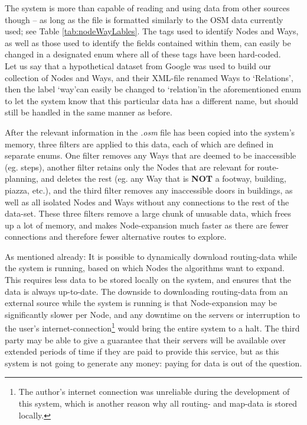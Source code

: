 The system is more than capable of reading and using data from other sources though -- as long as the file is formatted similarly to the OSM data currently used; see Table \ref{tab:nodeWayLables}. The tags used to identify Nodes and Ways, as well as those used to identify the fields contained within them, can easily be changed in a designated enum where all of these tags have been hard-coded.\\
Let us say that a hypothetical dataset from Google was used to build our collection of Nodes and Ways, and their XML-file renamed Ways to \textquoteleft Relations\textquoteright, then the label \textquoteleft way\textquoteright can easily be changed to \textquoteleft relation\textquoteright in the aforementioned enum to let the system know that this particular data has a different name, but should still be handled in the same manner as before.

After the relevant information in the \textit{.osm} file has been copied into the system's memory, three filters are applied to this data, each of which are defined in separate enums. One filter removes any Ways that are deemed to be inaccessible (eg. steps), another filter retains only the Nodes that are relevant for route-planning, and deletes the rest (eg. any Way that is \textbf{NOT} a footway, building, piazza, etc.), and the third filter removes any inaccessible doors in buildings, as well as all isolated Nodes and Ways without any connections to the rest of the data-set. These three filters remove a large chunk of unusable data, which frees up a lot of memory, and makes Node-expansion much faster as there are fewer connections and therefore fewer alternative routes to explore.

As mentioned already: It is possible to dynamically download routing-data while the system is running, based on which Nodes the algorithms want to expand. This requires less data to be stored locally on the system, and ensures that the data is always up-to-date. The downside to downloading routing-data from an external source while the system is running is that Node-expansion may be significantly slower per Node, and any downtime on the servers or interruption to the user's internet-connection\footnote{The author's internet connection was unreliable during the development of this system, which is another reason why all routing- and map-data is stored locally.} would bring the entire system to a halt. The third party may be able to give a guarantee that their servers will be available over extended periods of time if they are paid to provide this service, but as this system is not going to generate any money: paying for data is out of the question.

